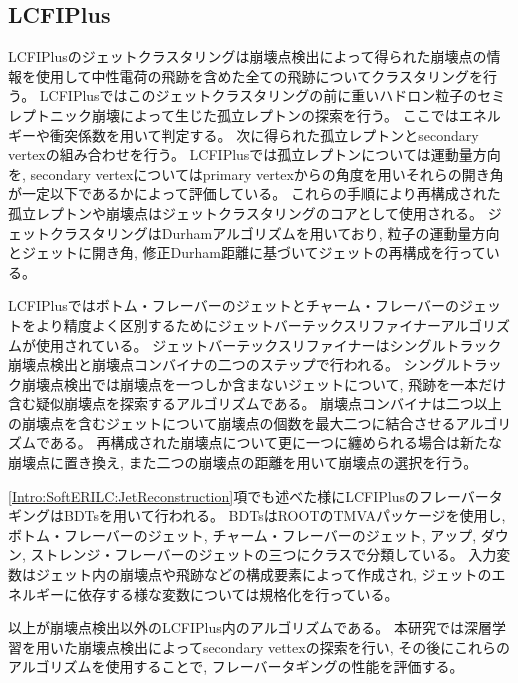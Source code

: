 \subsection{LCFIPlus} \label{Com:FlaTagCom:LCFIPlus}

LCFIPlusのジェットクラスタリングは崩壊点検出によって得られた崩壊点の情報を使用して中性電荷の飛跡を含めた全ての飛跡についてクラスタリングを行う。
LCFIPlusではこのジェットクラスタリングの前に重いハドロン粒子のセミレプトニック崩壊によって生じた孤立レプトンの探索を行う。
ここではエネルギーや衝突係数を用いて判定する。
次に得られた孤立レプトンとsecondary vertexの組み合わせを行う。
LCFIPlusでは孤立レプトンについては運動量方向を, secondary vertexについてはprimary vertexからの角度を用いそれらの開き角が一定以下であるかによって評価している。
これらの手順により再構成された孤立レプトンや崩壊点はジェットクラスタリングのコアとして使用される。
ジェットクラスタリングはDurhamアルゴリズムを用いており, 粒子の運動量方向とジェットに開き角, 修正Durham距離に基づいてジェットの再構成を行っている。

LCFIPlusではボトム・フレーバーのジェットとチャーム・フレーバーのジェットをより精度よく区別するためにジェットバーテックスリファイナーアルゴリズムが使用されている。
ジェットバーテックスリファイナーはシングルトラック崩壊点検出と崩壊点コンバイナの二つのステップで行われる。
シングルトラック崩壊点検出では崩壊点を一つしか含まないジェットについて, 飛跡を一本だけ含む疑似崩壊点を探索するアルゴリズムである。
崩壊点コンバイナは二つ以上の崩壊点を含むジェットについて崩壊点の個数を最大二つに結合させるアルゴリズムである。
再構成された崩壊点について更に一つに纏められる場合は新たな崩壊点に置き換え, また二つの崩壊点の距離を用いて崩壊点の選択を行う。

\ref{Intro:SoftERILC:JetReconstruction}項でも述べた様にLCFIPlusのフレーバータギングはBDTsを用いて行われる。
BDTsはROOTのTMVAパッケージを使用し, ボトム・フレーバーのジェット, チャーム・フレーバーのジェット, アップ, ダウン, ストレンジ・フレーバーのジェットの三つにクラスで分類している。
入力変数はジェット内の崩壊点や飛跡などの構成要素によって作成され, ジェットのエネルギーに依存する様な変数については規格化を行っている。

以上が崩壊点検出以外のLCFIPlus内のアルゴリズムである。
本研究では深層学習を用いた崩壊点検出によってsecondary vettexの探索を行い, その後にこれらのアルゴリズムを使用することで, フレーバータギングの性能を評価する。



